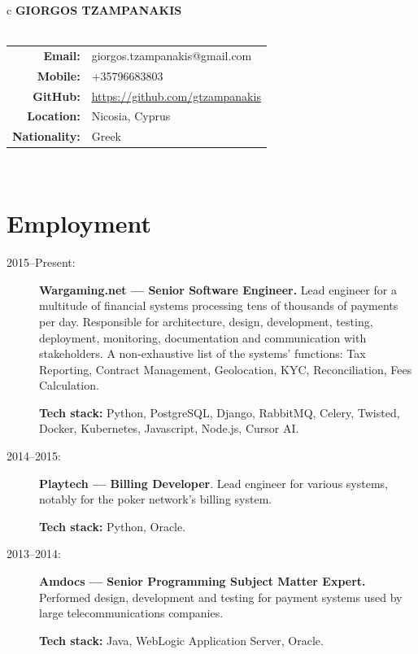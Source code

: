 \documentclass [a4paper,11pt]{article}
\begin{document}
	\begin {center}
		\begin {tabular} {c}
			\textbf {\Large {GIORGOS TZAMPANAKIS}} \\
			\\
				\begin {tabular} {rl}
					\textbf{Email:} & giorgos.tzampanakis@gmail.com \\
					\textbf{Mobile:} & +35796683803 \\
					\textbf{GitHub:} & \url{https://github.com/gtzampanakis} \\
					\textbf{Location:} & Nicosia, Cyprus \\
					\textbf{Nationality:} & Greek \\
				\end {tabular} \\
		\end {tabular}
	\end {center}

	\medskip

	\section* {Employment}
		\begin {description}

            \item [2015--Present:] \textbf{Wargaming.net --- Senior Software
            Engineer.} Lead engineer for a multitude of financial systems
            processing tens of thousands of payments per day.  Responsible for
            architecture, design, development, testing, deployment, monitoring,
            documentation and communication with stakeholders. A non-exhaustive
            list of the systems' functions: Tax Reporting, Contract Management,
            Geolocation, KYC, Reconciliation, Fees Calculation.

            \textbf{Tech stack:} Python, PostgreSQL, Django, RabbitMQ, Celery, Twisted,
            Docker, Kubernetes, Javascript, Node.js, Cursor AI.

            \item [2014--2015:] \textbf{Playtech --- Billing Developer}. Lead
            engineer for various systems, notably for the poker network's
            billing system.

            \textbf{Tech stack:} Python, Oracle.

            \item [2013--2014:] \textbf{Amdocs --- Senior Programming Subject
            Matter Expert.} Performed design, development and testing for
            payment systems used by large telecommunications companies.

            \textbf{Tech stack:} Java, WebLogic Application Server, Oracle.

		\end {description}
\end{document}
